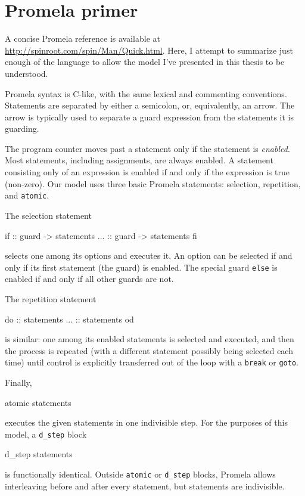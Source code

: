\section{Promela primer}\label{sec:promela}
A concise Promela reference is available at
\url{http://spinroot.com/spin/Man/Quick.html}. Here, I attempt to
summarize just enough of the language to allow the model I've
presented in this thesis to be understood.

Promela syntax is C-like, with the same lexical and commenting
conventions.  Statements are separated by either a semicolon, or,
equivalently, an arrow.  The arrow is typically used to separate a
guard expression from the statements it is guarding.

The program counter moves past a statement only if the statement is
{\it enabled}.  Most
statements, including assignments, are always enabled.
A statement consisting only of an expression is enabled if and only if the
expression is true (non-zero).
Our model uses three basic Promela statements: selection, repetition,
and {\tt atomic}.

The selection statement
\begin{inlinecode}
if
:: guard -> statements
...
:: guard -> statements
fi
\end{inlinecode}
selects one among its options and executes it.  An option can be
selected if and only if its first statement (the guard) is enabled.  The
special guard {\tt else} is enabled if and only if all other guards are not.

The repetition statement
\begin{inlinecode}
do
:: statements
...
:: statements
od
\end{inlinecode}
is similar: one among its enabled statements is selected and executed,
and then the process is repeated (with a different statement possibly
being selected each time) until control is explicitly transferred out
of the loop with a {\tt break} or {\tt goto}.

Finally,
\begin{inlinecode}
atomic { statements }
\end{inlinecode}
executes the given statements in one indivisible step.  For the
purposes of this model, a {\tt d\_step} block
\begin{inlinecode}
d_step { statements }
\end{inlinecode}
is functionally identical.
Outside {\tt atomic} or {\tt d\_step} blocks, Promela allows
interleaving before and after every statement, but statements are
indivisible.

